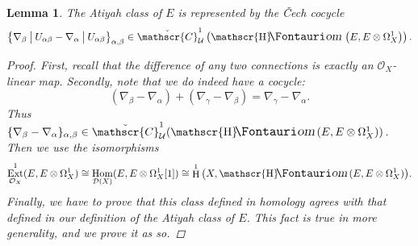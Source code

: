 \documentclass[11pt,fleqn]{article}
\theoremstyle{plain}
\newtheorem{lemma}[theorem]{Lemma}
\theoremstyle{definition}
\theoremstyle{remark}
\numberwithin{equation}{theorem}
\newcommand{\cover}{\mathcal{U}}
\newcommand{\OO}{\mathcal{O}}
\newcommand{\restricted}{\mathbin{\big\vert}}
\newcommand{\cech}{\check{\mathscr{C}}}
\DeclareMathOperator{\Hom}{Hom}
\DeclareMathOperator{\HH}{H}
\DeclareMathOperator{\sheafhom}{\mathscr{H}\textup{\kern -2.5pt {\large\Fontauri\slshape om}}\,}
\DeclareMathOperator{\Ext}{Ext}
\begin{document}
        \begin{lemma}\label{lemma:cech-cocycle-of-atiyah-class}
            The Atiyah class of $E$ is represented by the Čech cocycle
            \[
                \left\{
                    \nabla_\beta \restricted U_{\alpha\beta}
                    -
                    \nabla_\alpha \restricted U_{\alpha\beta}
                \right\}_{\alpha,\beta}
                \in
                \cech_\cover^1\left(
                    \sheafhom\left(E,E\otimes\Omega_X^1\right)
                \right).
            \]
            \begin{proof}
                First, recall that the difference of any two connections is exactly an $\OO_X$-linear map.
                Secondly, note that we do indeed have a cocycle:
                \begin{equation*}
                    (\nabla_\beta-\nabla_\alpha) + (\nabla_\gamma-\nabla_\beta) = \nabla_\gamma-\nabla_\alpha.
                \end{equation*}
                Thus $\{\nabla_\beta-\nabla_\alpha\}_{\alpha,\beta}\in\cech_\cover^1(\sheafhom(E,E\otimes\Omega_X^1))$.
                Then we use the isomorphisms
                \begin{equation*}
                    \Ext_{\OO_X}^1(E,E\otimes\Omega_X^1) \cong \Hom_{\mathcal{D}(X)}(E,E\otimes\Omega_X^1[1]) \cong \HH^1\big(X,\sheafhom(E,E\otimes\Omega_X^1)\big).
                \end{equation*}
                Finally, we have to prove that this class defined in homology agrees with that defined in our definition of the Atiyah class of $E$.
                This fact is true in more generality, and we prove it as so.


\end{proof}
\end{lemma}
\end{document}
